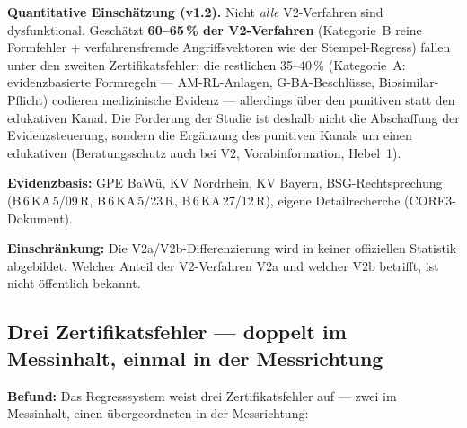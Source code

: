 \documentclass{umbruch-position}
\begin{document}
\textbf{Quantitative Einsch\"atzung (v1.2).} Nicht \emph{alle} V2-Verfahren sind dysfunktional. Gesch\"atzt \textbf{60--65\,\% der V2-Verfahren} (Kategorie~B reine Formfehler + verfahrensfremde Angriffsvektoren wie der Stempel-Regress) fallen unter den zweiten Zertifikatsfehler; die restlichen 35--40\,\% (Kategorie~A: evidenzbasierte Formregeln --- AM-RL-Anlagen, G-BA-Beschl\"usse, Biosimilar-Pflicht) codieren medizinische Evidenz --- allerdings \"uber den punitiven statt den edukativen Kanal. Die Forderung der Studie ist deshalb nicht die Abschaffung der Evidenzsteuerung, sondern die Erg\"anzung des punitiven Kanals um einen edukativen (Beratungsschutz auch bei V2, Vorabinformation, Hebel~1).

\textbf{Evidenzbasis:} GPE BaW\"u, KV Nordrhein, KV Bayern, BSG-Rechtsprechung (B\,6\,KA\,5/09\,R, B\,6\,KA\,5/23\,R, B\,6\,KA\,27/12\,R), eigene Detailrecherche (CORE3-Dokument).

\textbf{Einschr\"ankung:} Die V2a/V2b-Differenzierung wird in keiner offiziellen Statistik abgebildet. Welcher Anteil der V2-Verfahren V2a und welcher V2b betrifft, ist nicht \"offentlich bekannt.

\subsection{Drei Zertifikatsfehler --- doppelt im Messinhalt, einmal in der Messrichtung}

\textbf{Befund:} Das Regresssystem weist drei Zertifikatsfehler auf --- zwei im Messinhalt, einen \"ubergeordneten in der Messrichtung:
\end{document}
